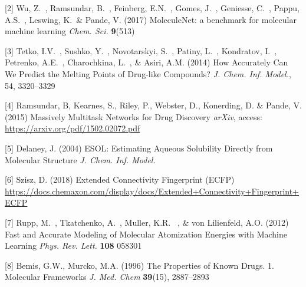 \documentclass{article}
\begin{document}
[2] Wu, Z.\ , Ramsundar, B.\ , Feinberg, E.N.\ , Gomes, J.\ , Geniesse, C.\ , Pappu, A.S.\ , Leswing, K.\ \& Pande, V. (2017) MoleculeNet: a benchmark for molecular machine learning {\it Chem. Sci.}  {\bf 9}(513)

[3] Tetko, I.V.\ , Sushko, Y.\ , Novotarskyi, S.\ , Patiny, L.\ , Kondratov, I.\ , Petrenko, A.E.\ , Charochkina, L.\ , \& Asiri, A.M. (2014) How Accurately Can We Predict the Melting Points of Drug-like
Compounds? {\it J. Chem. Inf. Model.}, 54, 3320--3329

[4] Ramsundar, B, Kearnes, S., Riley, P., Webster, D., Konerding, D. \& Pande, V. (2015) Massively Multitask Networks for Drug Discovery {\it arXiv}, access: \url{https://arxiv.org/pdf/1502.02072.pdf}

[5] Delaney, J. (2004) ESOL: Estimating Aqueous Solubility Directly from Molecular Structure {\it J. Chem. Inf. Model.}

[6] Szisz, D. (2018) Extended Connectivity Fingerprint (ECFP) \url{https://docs.chemaxon.com/display/docs/Extended+Connectivity+Fingerprint+ECFP}

[7] Rupp, M.\ , Tkatchenko, A.\ , Muller, K.R. \ , \& von Lilienfeld, A.O. (2012) Fast and Accurate Modeling of Molecular Atomization Energies with Machine Learning {\it Phys. Rev. Lett.} \textbf{108} 058301

[8] Bemis, G.W., Murcko, M.A. (1996) The Properties of Known Drugs. 1. Molecular Frameworks {\it J. Med. Chem} \textbf{39}(15), 2887–2893
\end{document}

